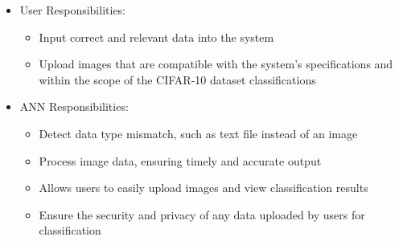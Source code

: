 \documentclass[12pt]{article}
\begin{document}

\begin{itemize}
\item User Responsibilities:
\begin{itemize}
\item Input correct and relevant data into the system
\item Upload images that are compatible with the system's specifications 
and within the scope of the CIFAR-10 dataset classifications
\end{itemize}
\item ANN Responsibilities:
\begin{itemize}
\item Detect data type mismatch, such as text file instead of an image
\item Process image data, ensuring timely and accurate output
\item Allows users to easily upload images and view classification results
\item Ensure the security and privacy of any data uploaded by users for classification
\end{itemize}
\end{itemize}

\end{document}
